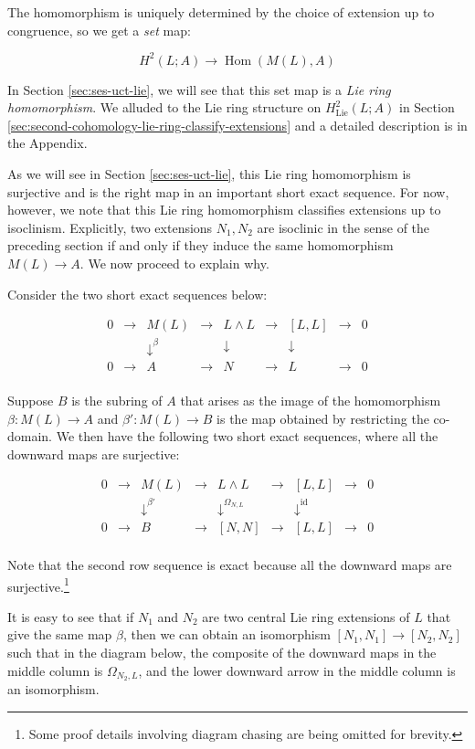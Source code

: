 The homomorphism is uniquely determined by the choice of extension up
to congruence, so we get a {\em set} map:

$$H^2(L;A) \to \operatorname{Hom}(M(L),A)$$

In Section \ref{sec:ses-uct-lie}, we will see that this set map is a {\em
  Lie ring homomorphism}. We alluded to the Lie ring structure on
$H^2_{\text{Lie}}(L;A)$ in Section
\ref{sec:second-cohomology-lie-ring-classify-extensions} and a
detailed description is in the Appendix.

As we will see in Section \ref{sec:ses-uct-lie}, this Lie ring homomorphism
is surjective and is the right map in an important short exact
sequence. For now, however, we note that this Lie ring homomorphism
classifies extensions up to isoclinism. Explicitly, two extensions
$N_1,N_2$ are isoclinic in the sense of the preceding section if and
only if they induce the same homomorphism $M(L) \to A$. We now proceed
to explain why.

Consider the two short exact sequences below:

$$\begin{array}{ccccccccc}
0 & \to & M(L) & \to & L \wedge L & \to & [L,L] & \to & 0\\
 &&   \downarrow^{\beta}  &&  \downarrow     && \downarrow&&\\
0 & \to & A &\to & N & \to & L & \to & 0\\
\end{array}$$

Suppose $B$ is the subring of $A$ that arises as the image of the
homomorphism $\beta: M(L) \to A$ and $\beta':M(L) \to B$ is the map
obtained by restricting the co-domain. We then have the following two
short exact sequences, where all the downward maps are surjective:

$$\begin{array}{ccccccccc}
0 & \to & M(L) & \to & L \wedge L & \to & [L,L] & \to & 0\\
 &&   \downarrow^{\beta'}  &&  \downarrow^{\Omega_{N,L}}     && \downarrow^{\text{id}}&& \\
0 & \to & B &\to & [N,N] & \to & [L,L] & \to & 0\\
\end{array}$$

Note that the second row sequence is exact because all the downward
maps are surjective.\footnote{Some proof details involving diagram
  chasing are being omitted for brevity.}

It is easy to see that if $N_1$ and $N_2$ are two central Lie ring
extensions of $L$ that give the same map $\beta$, then we can obtain
an isomorphism $[N_1,N_1] \to [N_2,N_2]$ such that in the diagram
below, the composite of the downward maps in the middle column is
$\Omega_{N_2,L}$, and the lower downward arrow in the middle column is
an isomorphism.

